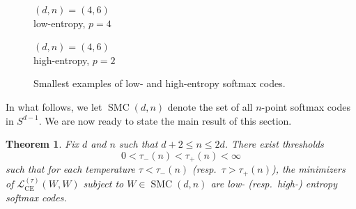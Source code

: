 \documentclass{article}
\theoremstyle{plain}
\newtheorem{theorem}{Theorem}
\theoremstyle{definition}
\begin{document}
\begin{figure}[t]

\begin{minipage}[t]{0.2\linewidth}
\centering
\footnotesize
$(d,n)=(4,6)$\\
low-entropy, $p=4$
\end{minipage}
\qquad\qquad\qquad\qquad\qquad\quad
\begin{minipage}[t]{0.3\linewidth}
\centering
\footnotesize
$(d,n)=(4,6)$\\
high-entropy, $p=2$
\end{minipage}

\vspace{12pt}

\caption{Smallest examples of low- and high-entropy softmax codes.\label{fig.softmax_codes}}
\end{figure}


In what follows, we let $\operatorname{SMC}(d,n)$ denote the set of all $n$-point softmax codes in $S^{d-1}$.
We are now ready to state the main result of this section.

\begin{theorem}
\label{thm.low high entropy}
Fix $d$ and $n$ such that $d+2\leq n \leq 2d$.
There exist thresholds
\[
0<\tau_-(n)<\tau_+(n)<\infty
\]
such that for each temperature $\tau<\tau_-(n)$ (resp.\ $\tau>\tau_+(n)$), the minimizers of $\mathcal{L}_{\operatorname{CE}}^{(\tau)}(W,W)$ subject to $W\in\operatorname{SMC}(d,n)$ are low- (resp.\ high-) entropy softmax codes.
\end{theorem}
\end{document}
